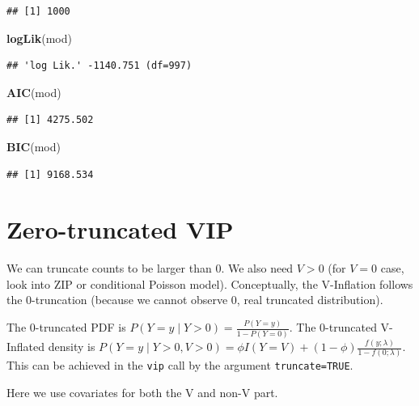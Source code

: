 \documentclass[]{article}
\newenvironment{Shaded}{\begin{snugshade}}{\end{snugshade}}
\newcommand{\KeywordTok}[1]{\textcolor[rgb]{0.13,0.29,0.53}{\textbf{#1}}}
\newcommand{\NormalTok}[1]{#1}
\begin{document}
\begin{verbatim}
## [1] 1000
\end{verbatim}

\begin{Shaded}
\begin{Highlighting}[]
\KeywordTok{logLik}\NormalTok{(mod)}
\end{Highlighting}
\end{Shaded}

\begin{verbatim}
## 'log Lik.' -1140.751 (df=997)
\end{verbatim}

\begin{Shaded}
\begin{Highlighting}[]
\KeywordTok{AIC}\NormalTok{(mod)}
\end{Highlighting}
\end{Shaded}

\begin{verbatim}
## [1] 4275.502
\end{verbatim}

\begin{Shaded}
\begin{Highlighting}[]
\KeywordTok{BIC}\NormalTok{(mod)}
\end{Highlighting}
\end{Shaded}

\begin{verbatim}
## [1] 9168.534
\end{verbatim}

\section{Zero-truncated VIP}\label{zero-truncated-vip}

We can truncate counts to be larger than 0. We also need \(V>0\) (for
\(V=0\) case, look into ZIP or conditional Poisson model). Conceptually,
the V-Inflation follows the 0-truncation (because we cannot observe 0,
real truncated distribution).

The 0-truncated PDF is \(P(Y=y \mid Y>0) = \frac{P(Y=y)}{1 - P(Y=0)}\).
The 0-truncated V-Inflated density is
\(P(Y=y \mid Y>0,V>0) = \phi I(Y=V) + (1-\phi) \frac{f(y; \lambda)}{1-f(0; \lambda)}\).
This can be achieved in the \texttt{vip} call by the argument
\texttt{truncate=TRUE}.

Here we use covariates for both the V and non-V part.
\end{document}
